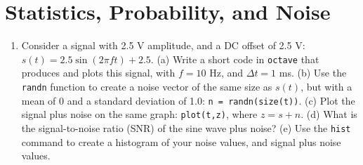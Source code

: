 \documentclass{article}
\begin{document}
\section{Statistics, Probability, and Noise}

\begin{enumerate}
\item Consider a signal with 2.5 V amplitude, and a DC offset of 2.5 V: $s(t) = 2.5\sin(2\pi f t) + 2.5$.  (a) Write a short code in \verb+octave+ that produces and plots this signal, with $f = 10$ Hz, and $\Delta t = 1$ ms. (b) Use the \verb+randn+ function to create a noise vector of the same size as $s(t)$, but with a mean of 0 and a standard deviation of 1.0: \verb+n = randn(size(t))+.  (c) Plot the signal plus noise on the same graph: \verb+plot(t,z)+, where $z = s+n$.  (d) What is the signal-to-noise ratio (SNR) of the sine wave plus noise? (e) Use the \verb+hist+ command to create a histogram of your noise values, and signal plus noise values.
\end{enumerate}
\end{document}
